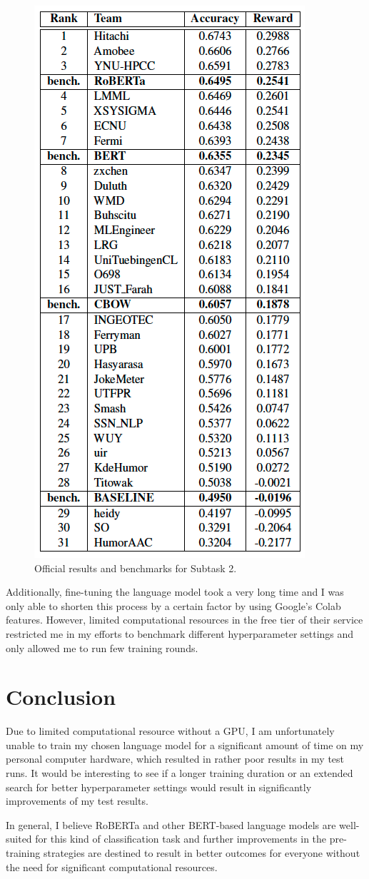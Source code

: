 \documentclass[11pt,a4paper,onecolumn,oneside,notitlepage]{article}
\begin{document}
	\begin{figure}
		\begin{center}
			\includegraphics[width=0.3\linewidth]{images/paper_benchmarks.png}
		\end{center}

		\caption{Official results and benchmarks for Subtask 2.}\label{fig2}
	\end{figure}

	Additionally, fine-tuning the language model took a very long time and I was only able to shorten this process by a certain factor by using Google's Colab features. However, limited computational resources in the free tier of their service restricted me in my efforts to benchmark different hyperparameter settings and only allowed me to run few training rounds.


	\section{Conclusion}
	Due to limited computational resource without a GPU, I am unfortunately unable to train my chosen language model for a significant amount of time on my personal computer hardware, which resulted in rather poor results in my test runs. It would be interesting to see if a longer training duration or an extended search for better hyperparameter settings would result in significantly improvements of my test results.

	In general, I believe RoBERTa and other BERT-based language models are well-suited for this kind of classification task and further improvements in the pre-training strategies are destined to result in better outcomes for everyone without the need for significant computational resources.

	\printbibliography
\end{document}
